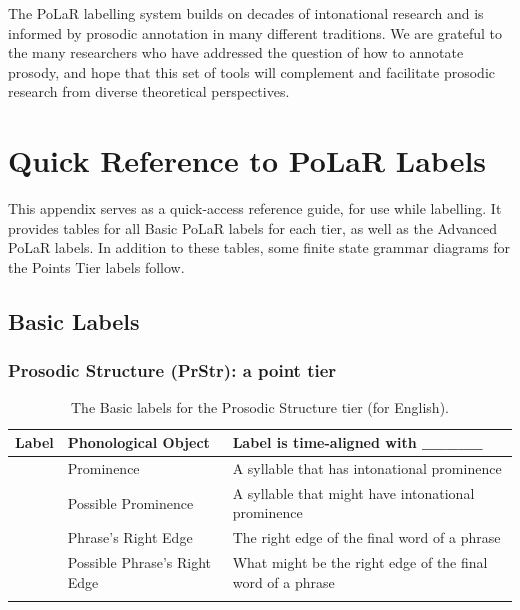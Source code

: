 \documentclass[11pt, twoside]{memoir}
\def\textlabel#1{{\relsize{-.5}\fontspec[Mapping=tex-text]{Roboto Mono}{#1}}}
\begin{document}
The PoLaR labelling system builds on decades of intonational research and is informed by prosodic annotation in many different traditions. We are grateful to the many researchers who have addressed the question of how to annotate prosody, and hope that this set of tools will complement and facilitate prosodic research from diverse theoretical perspectives.





\appendix
\chapter{Quick Reference to PoLaR Labels}\label{sec:polar-quick-reference-to-labels}

This appendix serves as a quick-access reference guide, for use while labelling. It provides tables for all Basic PoLaR labels for each tier, as well as the Advanced PoLaR labels. In addition to these tables, some finite state grammar diagrams for the Points Tier labels follow.


\section*{Basic Labels}

\subsection*{Prosodic Structure (PrStr): a point tier}
\begin{longtable}{clp{.525\linewidth}} \toprule \textbf{Label} & \textbf{Phonological Object} & \textbf{Label is time-aligned with \_\_\_\_\_}\tabularnewline
\midrule \endhead
\textlabel{*} & Prominence & A syllable that has intonational prominence \tabularnewline
\textlabel{?*} & Possible Prominence & A syllable that might have intonational prominence \tabularnewline
\textlabel{]} & Phrase’s Right Edge & The right edge of the final word of a phrase \tabularnewline
\textlabel{?]} & Possible Phrase’s Right Edge & What might be the right edge of the final word of a phrase \tabularnewline
\bottomrule 
\caption{The Basic labels for the Prosodic Structure tier (for English).%
}
\end{longtable}
\end{document}
